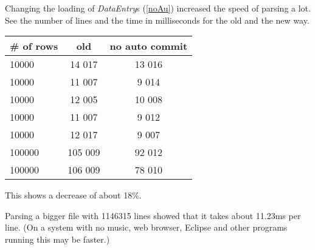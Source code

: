 Changing the loading of \textit{DataEntry}s (\ref{noAu}) increased
the speed of parsing a lot. See the number of lines and the time in milliseconds
for the old and the new way.

\begin{tabular}{l|c|c}
\# of rows & old & no auto commit \\
\hline
10000& 14 017 & 13 016\\
10000&11 007 &9 014\\
10000&12 005&10 008\\
10000&11 007&9 012\\
10000&12 017&9 007\\
100000&105 009 &92 012\\
100000&106 009 &78 010\\
\end{tabular}

This shows a decrease of about 18\%.

Parsing a bigger file with 1146315 lines showed
that it takes about 11.23ms per line. (On a system with no music, web browser,
Eclipse and other programs running this may be faster.)
